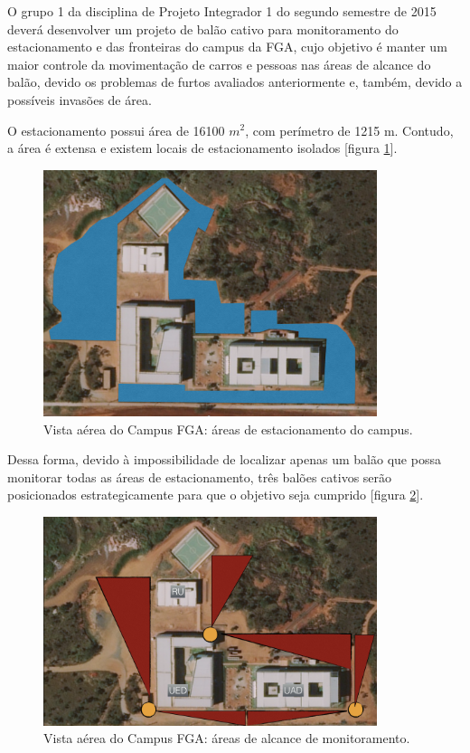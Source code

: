 O grupo 1 da disciplina de Projeto Integrador 1 do segundo semestre de 2015 deverá desenvolver um projeto de balão cativo para monitoramento do estacionamento e das fronteiras do campus da FGA, cujo objetivo é manter um maior controle da movimentação de carros e pessoas nas áreas de alcance do balão, devido os problemas de furtos avaliados anteriormente e, também, devido a possíveis invasões de área.

O estacionamento possui área de 16100 $m^2$, com perímetro de 1215 m. Contudo, a área é extensa e existem locais de estacionamento isolados [figura \ref{img:fga2}].

\begin{figure}[H]
  \centering
  \includegraphics[width=0.87\textwidth]{figuras/fga2}
  \caption{Vista aérea do Campus FGA: áreas de estacionamento do campus.}
  \label{img:fga2}
\end{figure}

Dessa forma, devido à impossibilidade de localizar apenas um balão que possa monitorar todas as áreas de estacionamento, três balões cativos serão posicionados estrategicamente para que o objetivo seja cumprido [figura \ref{img:fga3}].

\begin{figure}[H]
  \centering
  \includegraphics[width=0.87\textwidth]{figuras/fga3}
  \caption{Vista aérea do Campus FGA: áreas de alcance de monitoramento.}
  \label{img:fga3}
\end{figure}

